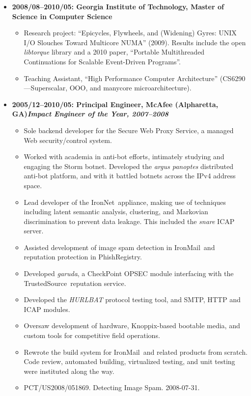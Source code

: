 \documentclass{article}
\newenvironment{tightitemize}
{\begin{itemize}
  \setlength{\itemsep}{1pt}
  \setlength{\parskip}{0pt}
  \setlength{\parsep}{0pt}}
{\end{itemize}}
\begin{document}
\begin{tightitemize}
\item \textbf{2008/08--2010/05: Georgia Institute of Technology, Master of Science in Computer Science}
\begin{tightitemize}
\item Research project: ``Epicycles, Flywheels, and (Widening) Gyres: UNIX I/O
  Slouches Toward Multicore NUMA'' (2009). Results include the open \textit{libtorque} library and a 2010 paper,
  ``Portable Multithreaded Continuations for Scalable Event-Driven Programs''.
\item Teaching Assistant, ``High Performance Computer Architecture'' (CS6290---Superscalar, OOO, and manycore microarchitecture).
\end{tightitemize}

\item \textbf{2005/12--2010/05: Principal Engineer, McAfee (Alpharetta, GA)\hfill \tiny{\textit{Impact Engineer of the Year, 2007--2008}}}
\begin{tightitemize}
\item Sole backend developer for the Secure Web Proxy Service, a managed Web
  security/control system.
\item Worked with academia in anti-bot efforts, intimately studying and engaging
  the Storm botnet. Developed the \textit{argus panoptes} distributed anti-bot
  platform, and with it battled botnets across the IPv4 address space.
\item Lead developer of the IronNet\texttrademark\ appliance, making use of techniques
  including latent semantic analysis, clustering, and Markovian discrimination
  to prevent data leakage. This included the \textit{snare} ICAP server.
\item Assisted development of image spam detection in IronMail\texttrademark\ and
  reputation protection in PhishRegistry\texttrademark.
\item Developed \textit{garuda}, a CheckPoint\textsuperscript{\textregistered} OPSEC module interfacing with the
  TrustedSource\texttrademark\ reputation service.
\item Developed the \textit{HURLBAT} protocol testing tool, and SMTP, HTTP and ICAP modules.
\item Oversaw development of hardware, Knoppix\textsuperscript{\textregistered}-based bootable media, and custom tools for competitive field operations.
\item Rewrote the build system for IronMail\texttrademark\ and related products from scratch.
  Code review, automated building, virtualized testing, and unit testing were
  instituted along the way.
\item PCT/US2008/051869. Detecting Image Spam. 2008-07-31.\hfill{}\\
\end{tightitemize}


\end{tightitemize}
\end{document}
